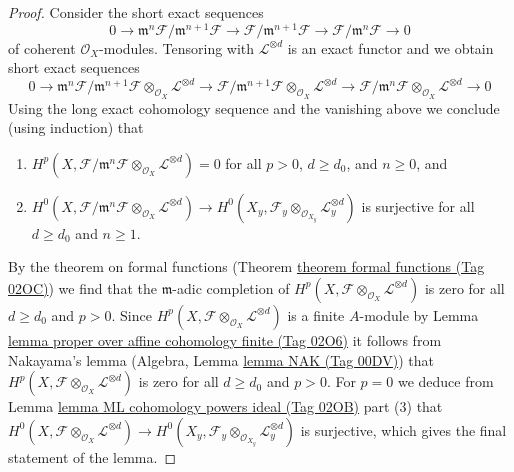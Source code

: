 \documentclass{amsart}
\theoremstyle{plain}
\theoremstyle{definition}
\theoremstyle{remark}
\numberwithin{equation}{subsection}
\begin{document}
\begin{proof}
\medskip\noindent
Consider the short exact sequences
$$
0 \to \mathfrak m^n\mathcal{F}/\mathfrak m^{n + 1} \mathcal{F}
\to \mathcal{F}/\mathfrak m^{n + 1} \mathcal{F}
\to \mathcal{F}/\mathfrak m^n \mathcal{F} \to 0
$$
of coherent $\mathcal{O}_X$-modules. Tensoring with $\mathcal{L}^{\otimes d}$
is an exact functor and we obtain short exact sequences
$$
0 \to
\mathfrak m^n\mathcal{F}/\mathfrak m^{n + 1} \mathcal{F}
\otimes_{\mathcal{O}_X} \mathcal{L}^{\otimes d}
\to \mathcal{F}/\mathfrak m^{n + 1} \mathcal{F}
\otimes_{\mathcal{O}_X} \mathcal{L}^{\otimes d}
\to \mathcal{F}/\mathfrak m^n \mathcal{F}
\otimes_{\mathcal{O}_X} \mathcal{L}^{\otimes d} \to 0
$$
Using the long exact cohomology sequence and the vanishing above
we conclude (using induction) that
\begin{enumerate}
\item $H^p(X, \mathcal{F}/\mathfrak m^n \mathcal{F}
\otimes_{\mathcal{O}_X} \mathcal{L}^{\otimes d}) = 0$
for all $p > 0$, $d \geq d_0$, and $n \geq 0$, and
\item $H^0(X, \mathcal{F}/\mathfrak m^n \mathcal{F}
\otimes_{\mathcal{O}_X} \mathcal{L}^{\otimes d}) \to
H^0(X_y, \mathcal{F}_y \otimes_{\mathcal{O}_{X_y}} \mathcal{L}_y^{\otimes d})$
is surjective for all $d \geq d_0$ and $n \geq 1$.
\end{enumerate}
By the theorem on formal functions (Theorem \href{https://stacks.math.columbia.edu/tag/02OC}{theorem formal functions (Tag 02OC)})
we find that the $\mathfrak m$-adic completion of
$H^p(X, \mathcal{F} \otimes_{\mathcal{O}_X} \mathcal{L}^{\otimes d})$
is zero for all $d \geq d_0$ and $p > 0$.
Since $H^p(X, \mathcal{F} \otimes_{\mathcal{O}_X} \mathcal{L}^{\otimes d})$
is a finite $A$-module by
Lemma \href{https://stacks.math.columbia.edu/tag/02O6}{lemma proper over affine cohomology finite (Tag 02O6)}
it follows from Nakayama's lemma (Algebra, Lemma \href{https://stacks.math.columbia.edu/tag/00DV}{lemma NAK (Tag 00DV)})
that $H^p(X, \mathcal{F} \otimes_{\mathcal{O}_X} \mathcal{L}^{\otimes d})$
is zero for all $d \geq d_0$ and $p > 0$.
For $p = 0$ we deduce from
Lemma \href{https://stacks.math.columbia.edu/tag/02OB}{lemma ML cohomology powers ideal (Tag 02OB)} part (3)
that $H^0(X, \mathcal{F} \otimes_{\mathcal{O}_X} \mathcal{L}^{\otimes d}) \to
H^0(X_y, \mathcal{F}_y \otimes_{\mathcal{O}_{X_y}} \mathcal{L}_y^{\otimes d})$
is surjective, which gives the final statement of the lemma.
\end{proof}
\end{document}
